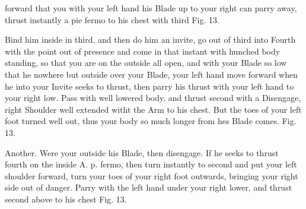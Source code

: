 \newpage


\newpage


forward that you with your left hand his Blade up to your right can
parry away, thrust instantly a pie fermo to his chest with third
Fig. 13.

\exercise{}

Bind him inside in third, and then do him an invite, go out of third
into Fourth with the point out of presence and come in that instant
with hunched body standing, so that you are on the outside all open,
and with your Blade so low that he nowhere but outside over your
Blade, your left hand move forward when he into your Invite seeks to
thrust, then parry his thrust with your left hand to your right
low. Pass with well lowered body, and thrust second with a Disengage,
right Shoulder well extended witht the Arm to his chest. But the toes
of your left foot turned well out, thus your body so much longer from
hes Blade comes. Fig. 13.

\exercise{}

Another. Were your outside his Blade, then disengage. If he seeks to
thrust fourth on the inside A. p. fermo, then turn instantly to second
and put your left shoulder forward, turn your toes of your right foot
outwards, bringing your right side out of danger. Parry with the left
hand under your right lower, and thrust second above to his chest
Fig. 13.

